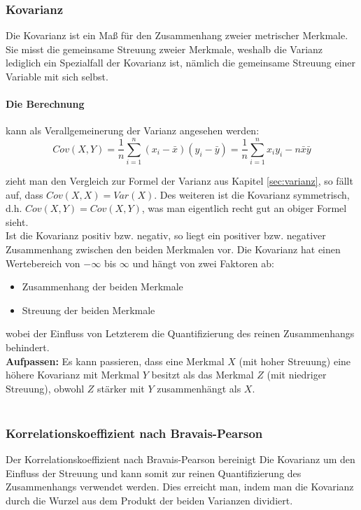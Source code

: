 \documentclass[a4paper]{article}
\newcommand\dangersign[1][2ex]{%
  \renewcommand\stacktype{L}%
  \scaleto{\stackon[1.3pt]{\color{red}$\triangle$}{\tiny !}}{#1}%
}
\begin{document}
\subsubsection{Kovarianz}
Die Kovarianz ist ein Maß für den Zusammenhang zweier metrischer Merkmale. Sie misst die gemeinsame Streuung zweier Merkmale, weshalb die Varianz lediglich ein Spezialfall der Kovarianz ist, nämlich die gemeinsame Streuung einer Variable mit sich selbst.

\paragraph{Die Berechnung} kann als Verallgemeinerung der Varianz angesehen werden:
$$Cov (X,Y) = \frac{1}{n}\sum_{i=1}^n(x_i-\bar{x})(y_i-\bar{y}) = \frac{1}{n}\sum_{i=1}^nx_iy_i-n\bar{x}\bar{y}$$

\noindent zieht man den Vergleich zur Formel der Varianz aus Kapitel \ref{sec:varianz}, so fällt auf, dass $Cov(X,X) = Var(X)$. Des weiteren ist die Kovarianz symmetrisch, d.h. $Cov(X,Y) = Cov(X,Y)$, was man eigentlich recht gut an obiger Formel sieht.\\
Ist die Kovarianz positiv bzw. negativ, so liegt ein positiver bzw. negativer Zusammenhang zwischen den beiden Merkmalen vor.
Die Kovarianz hat einen Wertebereich von $-\infty$ bis $\infty$ und hängt von zwei Faktoren ab:
\begin{itemize}
    \item Zusammenhang der beiden Merkmale
    \item Streuung der beiden Merkmale
\end{itemize}
wobei der Einfluss von Letzterem die Quantifizierung des reinen Zusammenhangs behindert.\\

\noindent \dangersign[3ex] \textbf{Aufpassen:} Es kann passieren, dass eine Merkmal $X$ (mit hoher Streuung) eine höhere Kovarianz mit Merkmal $Y$ besitzt als das Merkmal $Z$ (mit niedriger Streuung), obwohl $Z$ stärker mit $Y$ zusammenhängt als $X$.\\

\noindent {}\\

\subsubsection{Korrelationskoeffizient nach Bravais-Pearson}\label{sec:cor-bp}
Der Korrelationskoeffizient nach Bravais-Pearson bereinigt Die Kovarianz um den Einfluss der Streuung und kann somit zur reinen Quantifizierung des Zusammenhangs verwendet werden. Dies erreicht man, indem man die Kovarianz durch die Wurzel aus dem Produkt der beiden Varianzen dividiert.
\end{document}
